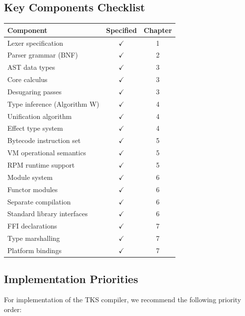 \subsection{Key Components Checklist}
\label{subsec:components-checklist}

\begin{center}
\begin{tabular}{lcc}
\toprule
\textbf{Component} & \textbf{Specified} & \textbf{Chapter} \\
\midrule
Lexer specification & $\checkmark$ & 1 \\
Parser grammar (BNF) & $\checkmark$ & 2 \\
AST data types & $\checkmark$ & 3 \\
Core calculus & $\checkmark$ & 3 \\
Desugaring passes & $\checkmark$ & 3 \\
Type inference (Algorithm W) & $\checkmark$ & 4 \\
Unification algorithm & $\checkmark$ & 4 \\
Effect type system & $\checkmark$ & 4 \\
Bytecode instruction set & $\checkmark$ & 5 \\
VM operational semantics & $\checkmark$ & 5 \\
RPM runtime support & $\checkmark$ & 5 \\
Module system & $\checkmark$ & 6 \\
Functor modules & $\checkmark$ & 6 \\
Separate compilation & $\checkmark$ & 6 \\
Standard library interfaces & $\checkmark$ & 6 \\
FFI declarations & $\checkmark$ & 7 \\
Type marshalling & $\checkmark$ & 7 \\
Platform bindings & $\checkmark$ & 7 \\
\bottomrule
\end{tabular}
\end{center}

\subsection{Implementation Priorities}
\label{subsec:impl-priorities}

For implementation of the TKS compiler, we recommend the following priority order:

